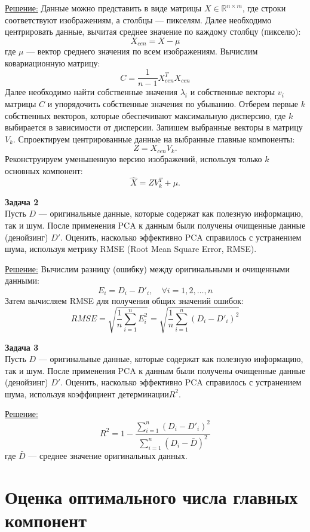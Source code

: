 \underline{Решение:}
Данные можно представить в виде матрицы \( X \in \mathbb{R}^{n \times m} \), где строки соответствуют изображениям, а столбцы — пикселям. Далее необходимо центрировать данные, вычитая среднее значение по каждому столбцу (пикселю):
   \[
   X_{cen} = X - \mu
   \]
   где \( \mu \) — вектор среднего значения по всем изображениям.
Вычислим ковариационную матрицу:
   \[
   C = \frac{1}{n-1} X_{cen}^T X_{cen}
   \]
Далее необходимо найти собственные значения \( \lambda_i \) и собственные векторы \( v_i \) матрицы \( C \) и упорядочить собственные значения по убыванию. Отберем первые \( k \) собственных векторов, которые обеспечивают максимальную дисперсию, где \( k \) выбирается в зависимости от дисперсии. Запишем выбранные векторы в матрицу \( V_k \).
Спроектируем центрированные данные на выбранные главные компоненты:
   \[
   Z = X_{cen} V_k.
   \]
Реконструируем уменьшенную версию изображений, используя только \( k \) основных компонент:
   \[
   \hat{X} = Z V_k^T + \mu.
   \]

\textbf{Задача 2}\\
Пусть \( D \) --- оригинальные данные, которые содержат как полезную информацию, так и шум. После применения PCA к данным были получены очищенные данные (денойзинг) \( D' \). Оценить, насколько эффективно PCA справилось с устранением шума, используя метрику RMSE (Root Mean Square Error, RMSE).

\underline{Решение:}
Вычислим разницу (ошибку) между оригинальными и очищенными данными:
   \[
   E_{i} = D_{i} - D'_{i}, \quad \forall i = 1, 2, \ldots, n
   \]
Затем вычисляем RMSE для получения общих значений ошибок:
   \[
   RMSE = \sqrt{\frac{1}{n} \sum_{i=1}^{n} E_{i}^2} = \sqrt{\frac{1}{n} \sum_{i=1}^{n} (D_{i} - D'_{i})^2}
   \]

\textbf{Задача 3}\\
Пусть \( D \) --- оригинальные данные, которые содержат как полезную информацию, так и шум. После применения PCA к данным были получены очищенные данные (денойзинг) \( D' \). Оценить, насколько эффективно PCA справилось с устранением шума, используя коэффициент детерминации\( R^2 \).

\underline{Решение:}
   \[
   R^2 = 1 - \frac{\sum_{i=1}^{n} (D_{i} - D'_{i})^2}{\sum_{i=1}^{n} (D_{i} - \bar{D})^2}
   \]
   где \( \bar{D} \) — среднее значение оригинальных данных.



\section{Оценка оптимального числа главных компонент}
